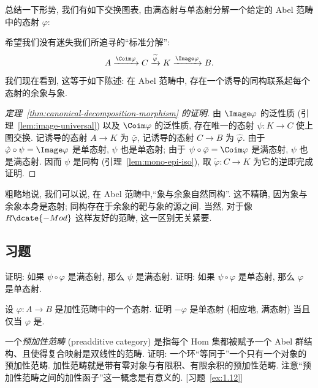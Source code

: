 \indent 总结一下形势, 我们有如下交换图表, 由满态射与单态射分解一个给定的 Abel 范畴中的态射 $\varphi$:
\begin{center}
\end{center}
\indent 希望我们没有迷失我们所追寻的``标准分解'':
\[
A\xrightarrow{\Coim\varphi} C\xrightarrow{\widetilde{\varphi}} K\xrightarrow{\Image\varphi} B.
\]
我们现在看到, 这等于如下陈述: 在 Abel 范畴中, 存在一个诱导的同构联系起每个态射的余象与象.
\begin{proof}[定理~\ref{thm:canonical-decomposition-morphism} 的证明]
由 $\Image\varphi$ 的泛性质 (引理~\ref{lem:image-universal}) 以及 $\Coim\varphi$ 的泛性质, 存在唯一的态射 $\psi:K\to C$ 使上图交换. 记诱导的态射 $A\to K$ 为 $\bar\varphi$, 记诱导的态射 $C\to B$ 为 $\hat\varphi$. 由于 $\hat\varphi\circ\psi=\Image\varphi$ 是单态射, $\psi$ 也是单态射; 由于 $\psi\circ\bar\varphi=\Coim\varphi$ 是满态射, $\psi$ 也是满态射. 因而 $\psi$ 是同构 (引理~\ref{lem:mono-epi-iso}), 取 $\widetilde\varphi:C\to K$ 为它的逆即完成证明.
\end{proof}
\indent 粗略地说, 我们可以说, 在 Abel 范畴中,``象与余象自然同构''. 这不精确, 因为象与余象本身是态射; 同构存在于余象的靶与象的源之间. 当然, 对于像 $R\dcate{-Mod}$ 这样友好的范畴, 这一区别无关紧要.

\subsection*{习题}
{}

\begin{prob}\label{ex:1.1}
证明: 如果 $\psi\circ\varphi$ 是满态射, 那么 $\psi$ 是满态射. 证明: 如果 $\psi\circ\varphi$ 是单态射, 那么 $\varphi$ 是单态射.
\end{prob}

\begin{prob}\label{ex:1.2}
设 $\varphi:A\to B$ 是加性范畴中的一个态射. 证明 $-\varphi$ 是单态射 (相应地, 满态射) 当且仅当 $\varphi$ 是.
\end{prob}

\begin{prob}\label{ex:1.3}
一个\emph{预加性范畴} (preadditive category) 是指每个 Hom 集都被赋予一个 Abel 群结构、且使得复合映射是双线性的范畴. 证明: 一个环``等同于''一个只有一个对象的预加性范畴. 加性范畴就是带有零对象与有限积、有限余积的预加性范畴. 注意``预加性范畴之间的加性函子''这一概念是有意义的. [习题~\ref{ex:1.12}]
\end{prob}

